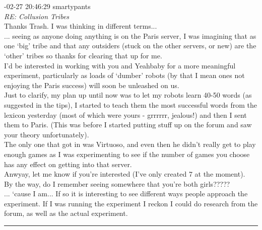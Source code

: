 \begin{mail}
{-02-27 20:46:29 smartypants}\\
{\itshape RE: Collusion Tribes}\\
Thanks Trash. I was thinking in different terms...\\
... seeing as anyone doing anything is on the Paris server, I was imagining that as one `big' tribe and that any outsiders (stuck on the other servers, or new) are the `other' tribes so thanks for clearing that up for me.\\
I'd be interested in working with you and Yeahbaby for a more meaningful experiment, particularly as loads of `dumber' robots (by that I mean ones not enjoying the Paris success) will soon be unleashed on us.\\
Just to clarify, my plan up until now was to let my robots learn 40-50 words (as suggested in the tips), I started to teach them the most successful words from the lexicon yesterday (most of which were yours - grrrrrr, jealous!) and then I sent them to Paris. (This was before I started putting stuff up on the forum and saw your theory unfortunately). \\
The only one that got in was Virtuoso, and even then he didn't really get to play enough games as I was experimenting to see if the number of games you choose has any effect on getting into that server.\\
Anwyay, let me know if you're interested (I've only created 7 at the moment).\\
By the way, do I remember seeing somewhere that you're both girls?????\\
... `cause I am...\clearpage
If so it is interesting to see different ways people approach the experiment. If I was running the experiment I reckon I could do research from the forum, as well as the actual experiment.\\

\rule{0.8\textwidth}{.4pt}


\end{mail}

